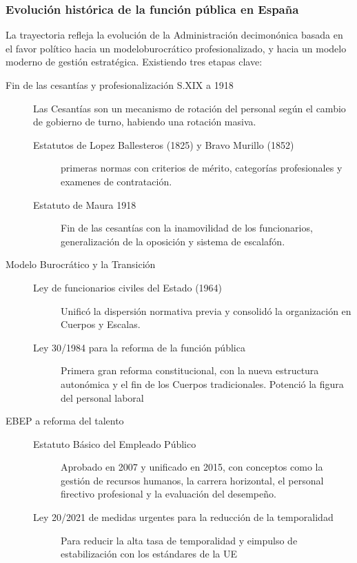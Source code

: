     \subsubsection{Evolución histórica de la función pública en España} %
        La trayectoria refleja la evolución de la Administración decimonónica basada en el favor político hacia un modeloburocrático profesionalizado, y hacia un modelo moderno de gestión estratégica. Existiendo tres etapas clave:
        \begin{description}
            \item[Fin de las cesantías y profesionalización S.XIX a 1918] Las Cesantías son un mecanismo de rotación del personal según el cambio de gobierno de turno, habiendo una rotación masiva.
            \begin{description}
                \item[Estatutos de Lopez Ballesteros (1825) y Bravo Murillo (1852)] primeras normas con criterios de mérito, categorías profesionales y examenes de contratación.
                \item[Estatuto de Maura 1918] Fin de las cesantías con la inamovilidad de los funcionarios, generalización de la oposición y sistema de escalafón.
            \end{description}
            \item[Modelo Burocrático y la Transición]
            \begin{description}
                \item[Ley de funcionarios civiles del Estado (1964)] Unificó la dispersión normativa previa y consolidó la organización en Cuerpos y Escalas.
                \item[Ley 30/1984 para la reforma de la función pública] Primera gran reforma constitucional, con la nueva estructura autonómica y el fin de los Cuerpos tradicionales. Potenció la figura del personal laboral
            \end{description}
            \item[EBEP a reforma del talento]
            \begin{description}
                \item[Estatuto Básico del Empleado Público] Aprobado en 2007  y unificado en 2015, con conceptos como la gestión de recursos humanos, la carrera horizontal, el personal firectivo profesional y la evaluación del desempeño.
                \item[Ley 20/2021 de medidas urgentes para la reducción de la temporalidad] Para reducir la alta tasa de temporalidad y eimpulso de estabilización con los estándares de la UE
            \end{description}
        \end{description}

